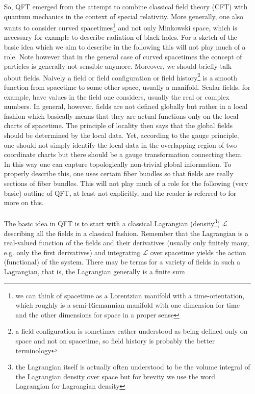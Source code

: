 So, QFT emerged from the attempt to combine classical field theory (CFT) with quantum mechanics in the context of special relativity. More generally, one also wants to consider curved spacetimes\footnote{we can think of spacetime as a Lorentzian manifold with a time-orientation, which roughly is a semi-Riemannian manifold with one dimension for time and the other dimensions for space in a proper sense} and not only Minkowski space, which is necessary for example to describe radiation of black holes. For a sketch of the basic idea which we aim to describe in the following this will not play much of a role. Note however that in the general case of curved spacetimes the concept of particles is generally not sensible anymore. Moreover, we should briefly talk about fields. Naively a field or field configuration or field history\footnote{a field configuration is sometimes rather understood as being defined only on space and not on spacetime, so field history is probably the better terminology} is a smooth function from spacetime to some other space, usually a manifold. Scalar fields, for example, have values in the field one considers, usually the real or complex numbers. In general, however, fields are not defined globally but rather in a local fashion which basically means that they are actual functions only on the local charts of spacetime. The principle of locality then says that the global fields should be determined by the local data. Yet, according to the gauge principle, one should not simply identify the local data in the overlapping region of two coordinate charts but there should be a gauge transformation connecting them. In this way one can capture topologically non-trivial global information. To properly describe this, one uses certain fiber bundles so that fields are really sections of fiber bundles. This will not play much of a role for the following (very basic) outline of QFT, at least not explicitly, and the reader is referred to \cite{00000001} for more on this.
\\\\
The basic idea in QFT is to start with a classical Lagrangian (density\footnote{the Lagrangian itself is actually often understood to be the volume integral of the Lagrangian density over space but for brevity we use the word Lagrangian for Lagrangian density}) $\mathcal{L}$ describing all the fields in a classical fashion. Remember that the Lagrangian is a real-valued function of the fields and their derivatives (usually only finitely many, e.g. only the first derivatives) and integrating $\mathcal{L}$ over spacetime yields the action (functional) of the system. There may be terms for a variety of fields in such a Lagrangian, that is, the Lagrangian generally is a finite sum
